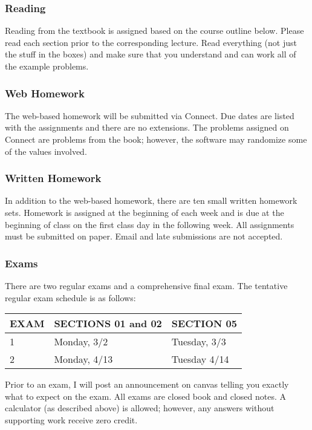 \documentclass[letterpaper,12pt,fleqn]{article}
\begin{document}
\subsubsection*{Reading}

Reading from the textbook is assigned based on the course outline below.  Please read each section prior to the
corresponding lecture.  Read everything (not just the stuff in the boxes) and make sure that you understand and can
work all of the example problems.

\subsubsection*{Web Homework}

The web-based homework will be submitted via Connect.  Due dates are listed with the assignments and there are no
extensions.  The problems assigned on Connect are problems from the book; however, the software may randomize some
of the values involved.

\subsubsection*{Written Homework}

In addition to the web-based homework, there are ten small written homework sets.  Homework is assigned at the
beginning of each week and is due at the beginning of class on the first class day in the following week.  All
assignments must be submitted on paper.  Email and late submissions are not accepted.

\subsubsection*{Exams}

There are two regular exams and a comprehensive final exam.  The tentative regular exam schedule is as follows:

\bigskip

\begin{tabular}{|l|l|l|}
  \hline
  \textbf{EXAM} & \textbf{SECTIONS 01 and 02} & \textbf{SECTION 05} \\
  \hline
  1 & Monday, 3/2 & Tuesday, 3/3 \\
  \hline
  2 & Monday, 4/13 & Tuesday 4/14 \\
  \hline
\end{tabular}
  
\bigskip

Prior to an exam, I will post an announcement on canvas telling you exactly what to expect on the exam.  All exams
are closed book and closed notes.  A calculator (as described above) is allowed; however, any answers without
supporting work receive zero credit.
\end{document}
